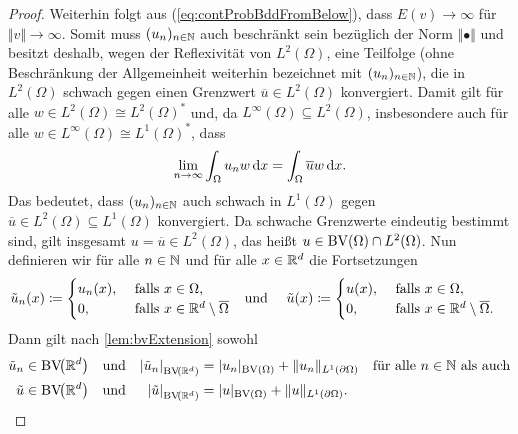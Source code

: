 \begin{proof}
  Weiterhin folgt aus (\ref{eq:contProbBddFromBelow}), dass
  $E(v)\rightarrow\infty$ für $\Vert v\Vert\rightarrow\infty$. 
  Somit muss $(u_n)_{n\in\mathbb{N}}$ auch beschränkt sein bezüglich der Norm
  $\Vert\bullet\Vert$ und besitzt deshalb, wegen der Reflexivität von
  $L^2(\Omega)$, eine Teilfolge (ohne Beschränkung der Allgemeinheit weiterhin
  bezeichnet mit $(u_n)_{n\in\mathbb{N}}$), die in $L^2(\Omega)$ schwach gegen einen
  Grenzwert $\overline{u}\in L^2(\Omega)$ konvergiert. 
  Damit gilt für alle $w\in L^2(\Omega)\cong L^2(\Omega)^\ast$ und, da
  $L^\infty(\Omega)\subseteq L^2(\Omega)$, insbesondere auch für alle $w\in
  L^\infty(\Omega)\cong L^1(\Omega)^\ast$, dass 
  \begin{align*}
    \lim_{n\to\infty}\int_\Omega u_n w\,\mathrm{d}x =\int_\Omega \overline{u} w\,\mathrm{d}x.
  \end{align*}
  Das bedeutet, dass $(u_n)_{n\in\mathbb{N}}$ auch schwach in $L^1(\Omega)$ gegen
  $\overline{u}\in L^2(\Omega)\subseteq L^1(\Omega)$ konvergiert. 
  Da schwache Grenzwerte eindeutig bestimmt sind, gilt insgesamt $u=\overline u
  \in L^2(\Omega)$, das heißt $u\in\textup{BV}(\Omega)\cap
  L^2(\Omega)$.
  Nun definieren wir für alle
  $n\in\mathbb{N}$ und für alle 
  $x\in\mathbb{R}^d$ die Fortsetzungen
  \begin{align*}
    \tilde{u}_n(x)
    &\coloneqq
    \begin{cases}
      u_n(x),  &\text{ falls } x\in\Omega,\\
      0,     &\text{ falls } x\in\mathbb{R}^d\setminus\overline\Omega
    \end{cases} 
    &&\text{und }
    &\tilde{u}(x)
    &\coloneqq
    \begin{cases}
      u(x),  &\text{ falls } x\in\Omega,\\
      0,     &\text{ falls } x\in\mathbb{R}^d\setminus\overline\Omega.
    \end{cases} 
  \end{align*}
  Dann gilt nach \cref{lem:bvExtension} sowohl
  \begin{align*}
    \tilde{u}_n
    &\in
    \textup{BV}\!\big(\mathbb{R}^d\big)
    &&\text{und}
    &\left|\tilde{u}_n\right|_{\textup{BV}\!\left(\mathbb{R}^d\right)} 
    &= 
    |u_n|_{\textup{BV}(\Omega)}+\Vert u_n\Vert_{L^1(\partial\Omega)}
    \quad\text{für alle }n\in\mathbb{N} \text{ als auch}\\
    \tilde{u}
    &\in
    \textup{BV}\!\big(\mathbb{R}^d\big)
    &&\text{und}
    &\left|\tilde{u}\right|_{\textup{BV}\!\left(\mathbb{R}^d\right)} 
    &=
    |u|_{\textup{BV}(\Omega)}+\Vert u\Vert_{L^1(\partial\Omega)}.
  \end{align*}

\end{proof}
